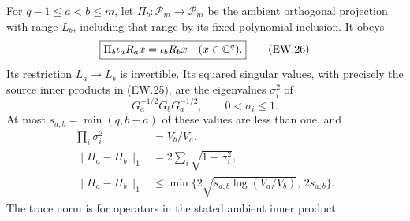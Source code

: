 \begin{theorem}
For $q-1\le a<b\le m$, let
$\Pi_b:\mathcal P_m\to\mathcal P_m$ be the ambient orthogonal
projection with range $L_b$, including that range by its fixed
polynomial inclusion. It obeys
\[
 \boxed{\Pi_b\iota_aR_ax=\iota_bR_bx\quad(x\in\mathbb{C}^q).}       \tag{EW.26}
\]
Its restriction $L_a\to L_b$ is invertible. Its squared singular
values, with precisely the source inner products in (EW.25), are
the eigenvalues $\sigma_i^2$ of
\[
 G_a^{-1/2}G_bG_a^{-1/2},\qquad0<\sigma_i\le1.
                                                               \tag{EW.27}
\]
At most $s_{a,b}=\min(q,b-a)$ of these values are less than one,
and
\[
 \begin{split}
 \prod_i\sigma_i^2&=V_b/V_a,\\
 \|\Pi_a-\Pi_b\|_1
 &=2\sum_i\sqrt{1-\sigma_i^2},\\
 \|\Pi_a-\Pi_b\|_1
 &\le\min\{2\sqrt{s_{a,b}\log(V_a/V_b)},\,2s_{a,b}\}.
 \end{split}                                                   \tag{EW.28}
\]
The trace norm is for operators in the stated ambient inner product.
\end{theorem}

